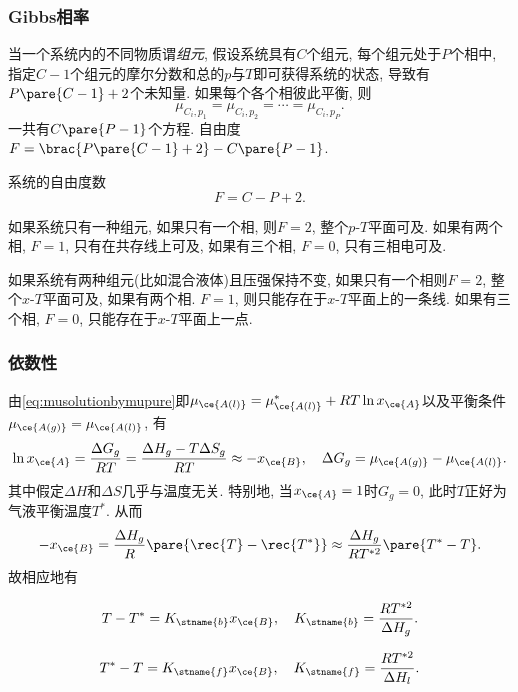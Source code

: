 \documentclass[../Thermal.tex]{subfiles}
\begin{document}
\subsubsection{Gibbs相率}
当一个系统内的不同物质谓\emph{组元}, 假设系统具有$C$个组元, 每个组元处于$P$个相中, 指定$C-1$个组元的摩尔分数和总的$p$与$T$即可获得系统的状态, 导致有$P\pare{C-1}+2$个未知量. 如果每个各个相彼此平衡, 则
\[ \mu_{C_i,p_1} = \mu_{C_i,p_2} = \cdots = \mu_{C_i,p_P}. \]
一共有$C\pare{P-1}$个方程. 自由度$F = \brac{P\pare{C-1}+2} - C\pare{P-1}$.
\begin{finale}
\begin{theorem}[Gibbs相率]
系统的自由度数
\[ F = C - P + 2. \]
\end{theorem}
\end{finale}
\begin{ex}
如果系统只有一种组元, 如果只有一个相, 则$F=2$, 整个$p$-$T$平面可及. 如果有两个相, $F=1$, 只有在共存线上可及, 如果有三个相, $F=0$, 只有三相电可及.
\end{ex}
\begin{ex}
如果系统有两种组元(比如混合液体)且压强保持不变, 如果只有一个相则$F=2$, 整个$x$-$T$平面可及, 如果有两个相. $F=1$, 则只能存在于$x$-$T$平面上的一条线. 如果有三个相, $F=0$, 只能存在于$x$-$T$平面上一点.
\end{ex}
\subsubsection{依数性}
由\eqref{eq:musolutionbymupure}即$\mu_{\ce{A(l)}} = \mu_{\ce{A(l)}}^* + RT\ln x_{\ce{A}}$以及平衡条件$\mu_{\ce{A(g)}} = \mu_{\ce{A(l)}}$, 有
\[ \ln x_{\ce{A}} = \frac{\Delta G_g}{RT} = \frac{\Delta H_g - T\Delta S_g}{RT} \approx -x_{\ce{B}},\quad \Delta G_g = \mu_{\ce{A(g)}} - \mu_{\ce{A(l)}}. \]
其中假定$\Delta H$和$\Delta S$几乎与温度无关. 特别地, 当$x_{\ce{A}} = 1$时$G_g=0$, 此时$T$正好为气液平衡温度$T^*$. 从而
\[ -x_{\ce{B}} = \frac{\Delta H_g}{R}\pare{\rec{T} - \rec{T^*}} \approx \frac{\Delta H_g}{RT^{*2}}\pare{T^* - T}. \]
故相应地有
\begin{corollary}[沸点升高常数]
\[ T - T^* = K_\stname{b}x_{\ce{B}},\quad K_\stname{b} = \frac{RT^{*2}}{\Delta H_g}. \]
\end{corollary}
\begin{corollary}[冰点降低常数]
\[ T^* - T = K_\stname{f}x_{\ce{B}},\quad K_\stname{f} = \frac{RT^{*2}}{\Delta H_l}. \]
\end{corollary}
\end{document}

